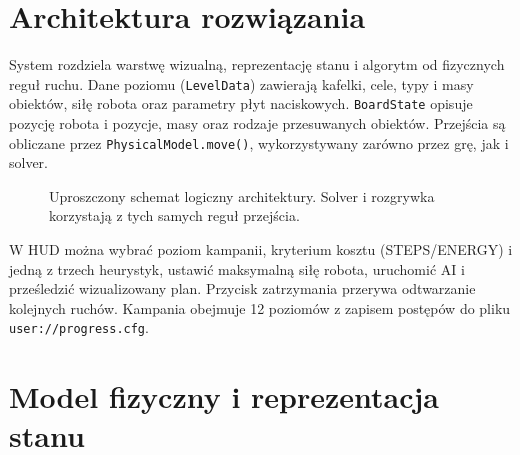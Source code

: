 \documentclass[a4paper,11pt]{article}
\begin{document}
\section{Architektura rozwiązania}
System rozdziela warstwę wizualną, reprezentację stanu i algorytm od fizycznych reguł ruchu. Dane poziomu (\texttt{LevelData}) zawierają kafelki, cele, typy i masy obiektów, siłę robota oraz parametry płyt naciskowych. \texttt{BoardState} opisuje pozycję robota i pozycje, masy oraz rodzaje przesuwanych obiektów. Przejścia są obliczane przez \texttt{PhysicalModel.move()}, wykorzystywany zarówno przez grę, jak i solver.

\begin{figure}[H]
\centering
{}
\caption{Uproszczony schemat logiczny architektury. Solver i rozgrywka korzystają z tych samych reguł przejścia.}
\label{fig:architecture}
\end{figure}

W HUD można wybrać poziom kampanii, kryterium kosztu (STEPS/ENERGY) i jedną z trzech heurystyk, ustawić maksymalną siłę robota, uruchomić AI i prześledzić wizualizowany plan. Przycisk zatrzymania przerywa odtwarzanie kolejnych ruchów. Kampania obejmuje 12 poziomów z zapisem postępów do pliku \texttt{user://progress.cfg}.

\section{Model fizyczny i reprezentacja stanu}
\end{document}
